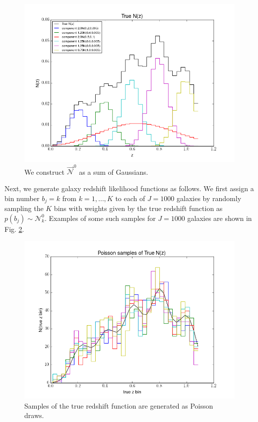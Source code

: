 \documentclass[12pt, onecolumn]{emulateapj}
\begin{document}
\begin{figure}
\label{fig:truenz}
\includegraphics[scale=0.5]{trueNz.png}
\caption{We construct $\vec{\mathcal{N}}^{0}$ as a sum of Gaussians.}
\end{figure}

Next, we generate galaxy redshift likelihood functions as follows.  We first assign a bin number $b_{j}=k$ from $k=1,\dots,K$ to each of $J=1000$ galaxies by randomly sampling the $K$ bins with weights given by the true redshift function as $p(b_{j})\sim\mathcal{N}^{0}_{k}$.  Examples of some such samples for $J=1000$ galaxies are shown in Fig. \ref{fig:obsnz}.

\begin{figure}
\label{fig:obsnz}
\includegraphics[scale=0.5]{obsNz.png}
\caption{Samples of the true redshift function are generated as Poisson draws.}
\end{figure}
\end{document}
